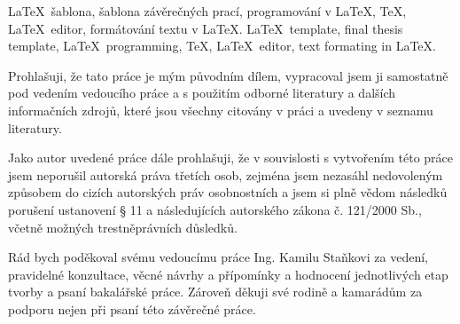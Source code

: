 \documentclass[12pt,a4paper,twoside]{book}
\begin{document}
\klicovaslova
{\LaTeX\ šablona, šablona závěrečných prací, programování v \LaTeX, \TeX, \LaTeX\ editor, formátování textu v \LaTeX.}
{\LaTeX\ template, final thesis template, \LaTeX\ programming, \TeX, \LaTeX\ editor, text formating in \LaTeX.}

\citace

\prohlaseni
{Prohlašuji, že tato práce je mým původním dílem, vypracoval jsem ji samostatně pod vedením vedoucího práce a s použitím odborné literatury a dalších informačních zdrojů, které jsou všechny citovány v práci a uvedeny v seznamu literatury.

Jako autor uvedené práce dále prohlašuji, že v souvislosti s vytvořením této práce jsem neporušil autorská práva třetích osob, zejména jsem nezasáhl nedovoleným způsobem do cizích autorských práv osobnostních a jsem si plně vědom následků porušení ustanovení § 11 a následujících autorského zákona č. 121/2000 Sb., včetně možných trestněprávních důsledků.}

\podekovani
{Rád bych poděkoval svému vedoucímu práce Ing. Kamilu Staňkovi za vedení, pravidelné konzultace, věcné návrhy a přípomínky a hodnocení jednotlivých etap tvorby a psaní bakalářské práce. Zároveň děkuji své rodině a kamarádům za podporu nejen při psaní této závěrečné práce.}

\obsah








\end{document}
